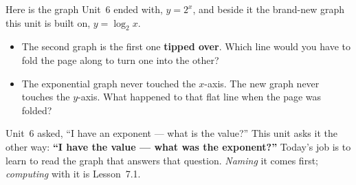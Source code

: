 \documentclass[10pt]{article}
\newcommand{\lgrid}[4]{%
  \draw[step=1, linegray!40, very thin] (#1,#3) grid (#2,#4);
  \draw[->, semithick, charcoal] (#1,0)--(#2,0) node[below right, font=\scriptsize]{$x$};
  \draw[->, semithick, charcoal] (0,#3)--(0,#4) node[left, font=\scriptsize]{$y$};}
\newcommand{\logcurve}[5]{\draw[very thick, forest, domain=#4:#5, samples=120, smooth]
  plot ({pow(#1,\x-(#3))+(#2)},{\x});}
\begin{document}
\begin{hookbox}
Here is the graph Unit~6 ended with, $y=2^x$, and beside it the brand-new graph this unit is built
on, $y=\log_2 x$.
\begin{center}
\end{center}
\begin{itemize}\setlength{\itemsep}{1pt}
  \item The second graph is the first one \textbf{tipped over}. Which line would you have to fold the page along to turn one into the other? 
  \item The exponential graph never touched the $x$-axis. The new graph never touches the $y$-axis. What happened to that flat line when the page was folded? 
\end{itemize}
Unit~6 asked, ``I have an exponent --- what is the value?'' This unit asks it the other way:
\textbf{``I have the value --- what was the exponent?''} Today's job is to learn to read the graph
that answers that question. \emph{Naming} it comes first; \emph{computing} with it is Lesson~7.1.
\end{hookbox}
\end{document}
